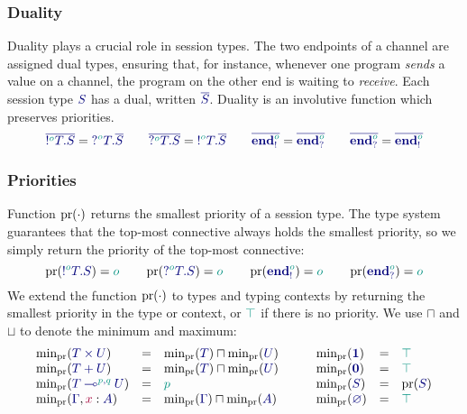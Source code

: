 \documentclass[main.tex]{subfiles}
\begin{document}
\subsubsection*{Duality}
Duality plays a crucial role in session types. The two endpoints of a channel are assigned dual types, ensuring that, for instance, whenever one program \emph{sends} a value on a channel, the program on the other end is waiting to \emph{receive}. Each session type $\ty{S}$ has a dual, written $\ty{\co{S}}$. Duality is an involutive function which preserves priorities.
\[
  \ty{\co{\tysend[\cs{o}]{T}{S}}} = \ty{\tyrecv[\cs{o}]{T}{\co{S}}}
  \qquad
  \ty{\co{\tyrecv[\cs{o}]{T}{S}}} = \ty{\tysend[\cs{o}]{T}{\co{S}}}
  \qquad
  \ty{\co{\tyends[\cs{o}]}} = \ty{\co{\tyendr[\cs{o}]}}
  \qquad
  \ty{\co{\tyendr[\cs{o}]}} = \ty{\co{\tyends[\cs{o}]}}
\]

\subsubsection*{Priorities}
Function $\operatorname{pr}(\cdot)$ returns the smallest priority of a session type. The type system guarantees that the top-most connective always holds the smallest priority, so we simply return the priority of the top-most connective:
\[
  \pr(\ty{\tysend[\cs{o}]{T}{S}}) = \cs{o}
  \qquad
  \pr(\ty{\tyrecv[\cs{o}]{T}{S}}) = \cs{o}
  \qquad
  \pr(\ty{\tyends[\cs{o}]})       = \cs{o}
  \qquad
  \pr(\ty{\tyendr[\cs{o}]})       = \cs{o}
\]
We extend the function $\operatorname{pr}(\cdot)$ to types and typing contexts by returning the smallest priority in the type or context, or $\cs{\top}$ if there is no priority. We use $\sqcap$ and $\sqcup$ to denote the minimum and maximum:
\[
\begin{array}{lcl}
  \minpr(\ty{\typrod{T}{U}})                 & = & \minpr({\ty{T}})\sqcap\minpr({\ty{U}}) \\
  \minpr(\ty{\tysum{T}{U}})                  & = & \minpr({\ty{T}})\sqcap\minpr({\ty{U}}) \\
  \minpr(\ty{\tylolli[\cs{p},\cs{q}]{T}{U}}) & = & \cs{p} \\
  \minpr(\ty{\Gamma}, \tmty{x}{A})           & = & \minpr(\ty{\Gamma})\sqcap\minpr(\ty{A})
\end{array}
\qquad
\begin{array}{lcl}
  \minpr(\ty{\tyunit})                       & = & \ptop \\
  \minpr(\ty{\tyvoid})                       & = & \ptop \\
  \minpr(\ty{S})                             & = & \pr(\ty{S}) \\
  \minpr(\ty{\emptyenv})                     & = & \ptop
\end{array}
\]
\end{document}
